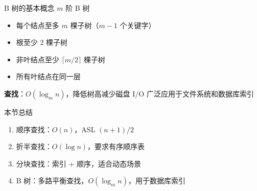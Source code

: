 \documentclass[10pt, aspectratio=169]{beamer}
\begin{document}
\begin{frame}{B 树的基本概念}
$m$ 阶 B 树
\begin{itemize}
\item 每个结点至多 $m$ 棵子树（$m-1$ 个关键字）
\item 根至少 2 棵子树
\item 非叶结点至少 $\lceil m/2 \rceil$ 棵子树
\item 所有叶结点在同一层
\end{itemize}
\vspace{0.3em}
\textbf{查找}：$O(\log_m n)$，降低树高减少磁盘 I/O
\vspace{0.3em}
广泛应用于文件系统和数据库索引
\end{frame}
\begin{frame}{本节总结}
\begin{enumerate}
\item 顺序查找：$O(n)$，ASL $(n+1)/2$
\item 折半查找：$O(\log n)$，要求有序顺序表
\item 分块查找：索引 + 顺序，适合动态场景
\item B 树：多路平衡查找，$O(\log_m n)$，用于数据库索引
\end{enumerate}
\end{frame}
\end{document}
